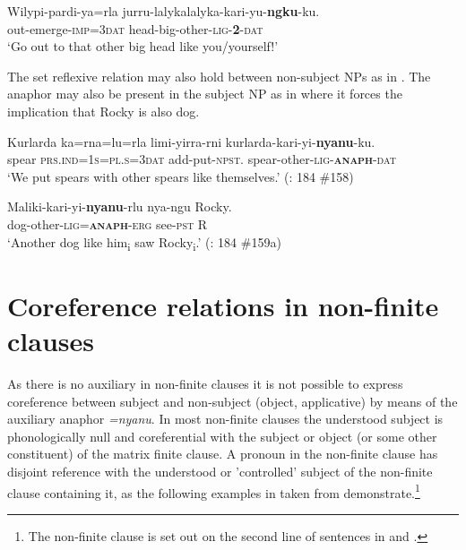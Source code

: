 \documentclass[output=paper]{../langscibook}
\begin{document}
\ea%
    \label{ex:laughren:35}
\gll Wilypi-pardi-ya=rla jurru-lalykalalyka-kari-yu-\textbf{ngku}-ku.\\
    out-emerge-\textsc{imp=3dat}  head-big-other-\textsc{lig-}\textbf{\textsc{2}}\textsc{{}-dat}\\
\glt `Go out to that other big head like you/yourself!'
\z


The set reflexive relation may also hold between non-subject NPs as in . The anaphor may also be present in the subject NP as in  where it forces the implication that Rocky is also dog.

\ea%
    \label{ex:laughren:36}

\ea
\label{ex:laughren:36a}
\gll Kurlarda  ka=rna=lu=rla  limi-yirra-rni  kurlarda-kari-yi-\textbf{nyanu}-ku.  \\
spear  \textsc{prs.ind=1s=pl.s=3dat}  add-put-\textsc{npst}.  spear-other-\textsc{lig-}\textbf{\textsc{anaph}}\textsc{{}-dat}\\
\glt `We put spears with other spears like themselves.' (\citealt{Simpson1991}: 184 \#158)

\ex
\label{ex:laughren:36b}
\gll Maliki-kari-yi-\textbf{nyanu}-rlu  nya-ngu  Rocky.\\
    dog-other-\textsc{lig=}\textbf{\textsc{anaph}}\textsc{{}-erg} see-\textsc{pst}  R\\

\glt `Another dog like him\textsubscript{i} saw Rocky\textsubscript{i}.' (\citealt{Simpson1991}: 184 \#159a)
\z
\z

\section{Coreference relations in non-finite clauses}\label{sec:laughren:5}

As there is no auxiliary in non-finite clauses it is not possible to express coreference between subject and non-subject (object, applicative) by means of the auxiliary anaphor \textit{=nyanu}. In most non-finite clauses the understood subject is phonologically null and coreferential with the subject or object (or some other constituent) of the matrix finite clause. A pronoun in the non-finite clause has disjoint reference with the understood or 'controlled' subject of the non-finite clause containing it, as the following examples in  taken from \citet{Simpson1991} demonstrate.\footnote{\textrm{The non-finite clause is set out on the second line of sentences in  and .}}
\end{document}
